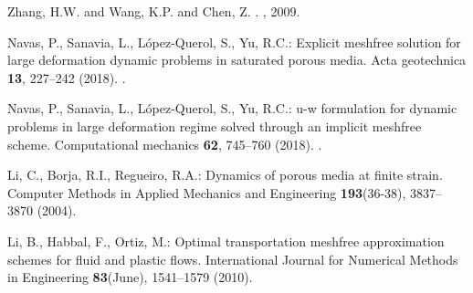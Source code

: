 \documentclass[12pt]{article}
\begin{document}

\begin{thebibliography}{10}

Zhang, H.W. and Wang, K.P.  and Chen, Z.
.
, 2009.

Navas, P., Sanavia, L., L{\'{o}}pez-Querol, S., Yu, R.C.: {Explicit meshfree
  solution for large deformation dynamic problems in saturated porous media.}
\newblock Acta geotechnica \textbf{13}, 227--242 (2018).
\newblock {}.

Navas, P., Sanavia, L., L{\'{o}}pez-Querol, S., Yu, R.C.: u-w formulation for
  dynamic problems in large deformation regime solved through an implicit
  meshfree scheme.
\newblock Computational mechanics \textbf{62}, 745--760 (2018).
\newblock {}.

Li, C., Borja, R.I., Regueiro, R.A.: {Dynamics of porous media at finite
  strain}.
\newblock Computer Methods in Applied Mechanics and Engineering
  \textbf{193}(36-38), 3837--3870 (2004).
\newblock {}

Li, B., Habbal, F., Ortiz, M.: {Optimal transportation meshfree approximation
  schemes for fluid and plastic flows}.
\newblock International Journal for Numerical Methods in Engineering
  \textbf{83}(June), 1541--1579 (2010).
\newblock {}



\end{thebibliography}
\end{document}
